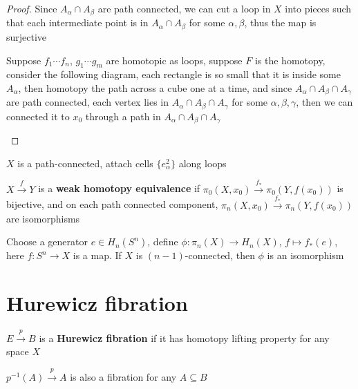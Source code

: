 \documentclass[main]{subfiles}
\begin{document}
\begin{proof}
Since $A_\alpha\cap A_\beta$ are path connected, we can cut a loop in $X$ into pieces such that each intermediate point is in $A_\alpha\cap A_\beta$ for some $\alpha,\beta$, thus the map is surjective \par
Suppose $f_1\cdots f_n$, $g_1\cdots g_m$ are homotopic as loops, suppose $F$ is the homotopy, consider the following diagram, each rectangle is so small that it is inside some $A_\alpha$, then homotopy the path across a cube one at a time, and since $A_\alpha\cap A_\beta\cap A_\gamma$ are path connected, each vertex lies in $A_\alpha\cap A_\beta\cap A_\gamma$ for some $\alpha,\beta,\gamma$, then we can connected it to $x_0$ through a path in $A_\alpha\cap A_\beta\cap A_\gamma$
\begin{center}
\end{center}
\end{proof}

\begin{theorem}
$X$ is a path-connected, attach cells $\{e^2_\alpha\}$ along loops
\end{theorem}

\begin{definition}
$X\xrightarrow f Y$ is a \textbf{weak homotopy equivalence} if $\pi_0(X,x_0)\xrightarrow{f_*}\pi_0(Y,f(x_0))$ is bijective, and on each path connected component, $\pi_n(X,x_0)\xrightarrow{f_*}\pi_n(Y,f(x_0))$ are isomorphisms
\end{definition}

\begin{theorem}\label{Hurewicz theorem}
Choose a generator $e\in H_n(S^n)$, define $\phi:\pi_n(X)\to H_n(X)$, $f\mapsto f_*(e)$, here $f:S^n\to X$ is a map. If $X$ is $ (n-1)$-connected, then $\phi$ is an isomorphism
\end{theorem}



\section{Hurewicz fibration}

\begin{definition}
$E\xrightarrow{p}B$ is a \textbf{Hurewicz fibration} if it has homotopy lifting property for any space $X$
\begin{center}
\end{center}
$p^{-1}(A)\xrightarrow{p} A$ is also a fibration for any $A\subseteq B$
\end{definition}
\end{document}
